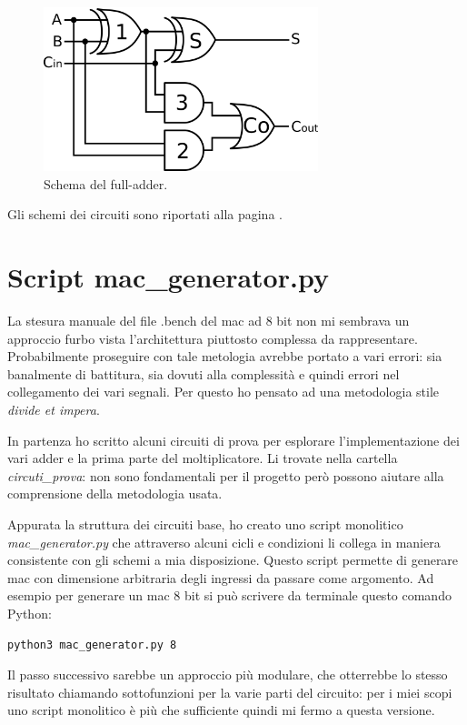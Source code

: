 \documentclass[12pt, letterpaper]{article}
\begin{document}
\begin{figure}
\centering
\includegraphics[width=8cm]{full_adder}
\caption{Schema del full-adder.}
\end{figure}

Gli schemi dei circuiti sono riportati alla pagina \pageref{rca}.

\section{Script mac\_generator.py}

La stesura manuale del file .bench del mac ad 8 bit non mi sembrava un approccio furbo vista l'architettura piuttosto complessa da rappresentare. Probabilmente proseguire con tale metologia avrebbe portato a vari errori: sia banalmente di battitura, sia dovuti alla complessità e quindi errori nel collegamento dei vari segnali. Per questo ho pensato ad una metodologia stile \textit{divide et impera}.

In partenza ho scritto alcuni circuiti di prova per esplorare l'implementazione dei vari adder e la prima parte del moltiplicatore.
Li trovate nella cartella \textit{circuti\_prova}: non sono fondamentali per il progetto però possono aiutare alla comprensione della metodologia usata.

Appurata la struttura dei circuiti base, ho creato uno script monolitico \textit{mac\_generator.py} che attraverso alcuni cicli e condizioni li collega in maniera consistente con gli schemi a mia disposizione.
Questo script permette di generare mac con dimensione arbitraria degli ingressi da passare come argomento.
Ad esempio per generare un mac 8 bit si può scrivere da terminale questo comando Python: 

\begin{lstlisting}
python3 mac_generator.py 8  
\end{lstlisting}

Il passo successivo sarebbe un approccio più modulare, che otterrebbe lo stesso risultato chiamando sottofunzioni per la varie parti del circuito: per i miei scopi uno script monolitico è più che sufficiente quindi mi fermo a questa versione.
\end{document}
